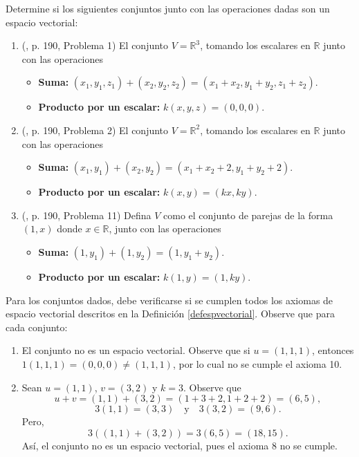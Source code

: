 \begin{example} 
Determine si los siguientes conjuntos junto con las operaciones dadas son un espacio vectorial:

\begin{enumerate}[$(a)$]
\item (\cite{anton2014elementary}, p. 190, Problema 1) El conjunto $V=\mathbb{R}^3$, tomando los escalares en $\mathbb{R}$ junto con las operaciones 
\begin{itemize}
\item \textbf{Suma:} $(x_1,y_1,z_1)+(x_2,y_2,z_2)=(x_1+x_2,y_1+y_2,z_1+z_2)$.
\item \textbf{Producto por un escalar:} $k(x,y,z)=(0,0,0)$.
\end{itemize}    

\item (\cite{anton2014elementary}, p. 190, Problema 2) El conjunto $V=\mathbb{R}^2$, tomando los escalares en $\mathbb{R}$ junto con las operaciones
\begin{itemize}
\item \textbf{Suma:} $(x_1,y_1)+(x_2,y_2)=(x_1+x_2+2,y_1+y_2+2)$.
\item \textbf{Producto por un escalar:} $k(x,y)=(kx,ky)$.
\end{itemize}            

\item (\cite{anton2014elementary}, p. 190, Problema 11) Defina $V$ como el conjunto de parejas de la forma $(1,x)$ donde $x \in \mathbb{R}$, junto con las operaciones
\begin{itemize}
\item \textbf{Suma:} $(1,y_1)+(1,y_2)=(1,y_1+y_2)$.
\item \textbf{Producto por un escalar:} $k(1,y)=(1,ky)$.
\end{itemize}          
\end{enumerate}

\begin{myproof}
Para los conjuntos dados, debe verificarse si se cumplen todos los axiomas de espacio vectorial descritos en la Definición \ref{defespvectorial}. Observe que para cada conjunto:

\begin{enumerate}[$(a)$]
\item El conjunto no es un espacio vectorial. Observe que si $u=(1,1,1)$, entonces $1(1,1,1)=(0,0,0)\neq (1,1,1)$, por lo cual no se cumple el axioma 10.

\item Sean $u=(1,1)$, $v=(3,2)$ y $k=3$. Observe que 
$$u+v=(1,1)+(3,2)=(1+3+2,1+2+2)=(6,5),$$
$$3(1,1)=(3,3) \quad \text{y} \quad 3(3,2)=(9,6).$$
Pero, 
$$3((1,1)+(3,2))=3(6,5)=(18,15).$$
Así, el conjunto no es un espacio vectorial, pues el axioma 8 no se cumple.


\end{enumerate}
\end{myproof}
\end{example}
